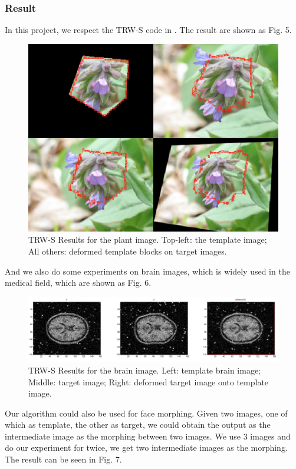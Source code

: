 \documentclass{article} %
\begin{document}
		\subsubsection{Result}
        In this project, we respect the TRW-S code in \cite{shekhovtsov2008efficient}. The result are shown as Fig. 5.
        \begin{figure}[!ht]
        \centering
        \includegraphics[scale=0.2]{showPlant.jpg}
        \caption{TRW-S Results for the plant image. Top-left: the template image; All others: deformed template blocks on target images.}
        \end{figure}
        And we also do some experiments on brain images, which is widely used in the medical field, which are shown as Fig. 6.
        \begin{figure}[!ht]
        \centering
        \includegraphics[scale=0.25]{showBrain.jpg}
        \caption{TRW-S Results for the brain image. Left: template brain image; Middle: target image; Right: deformed target image onto template image.}
        \end{figure}
        Our algorithm could also be used for face morphing. Given two images, one of which as template, the other as target, we could obtain the output as the intermediate image as the morphing between two images. We use 3 images and do our experiment for twice, we get two intermediate images as the morphing. The result can be seen in Fig. 7.
\end{document}
